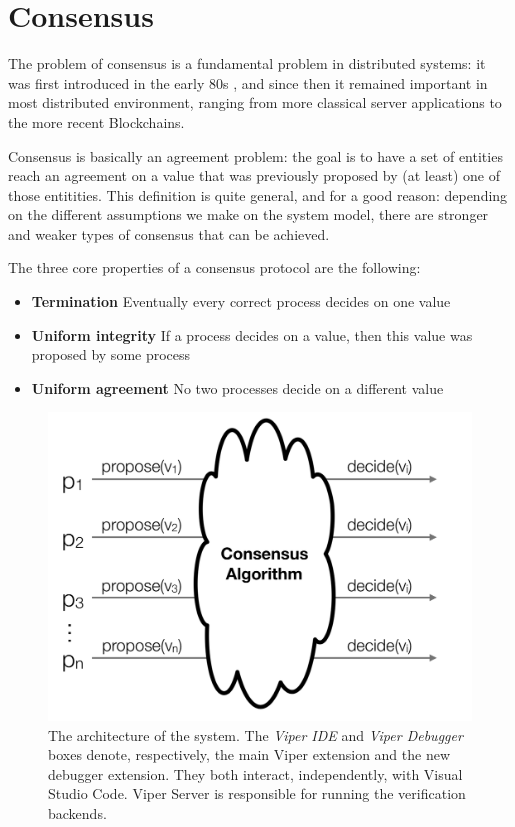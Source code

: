\section{Consensus}\label{sec:Consensus}

The problem of consensus is a fundamental problem in distributed systems: it was first introduced in the early 80s \cite[]{Pease}, \cite[]{Lamport} and since then it remained important in most distributed environment, ranging from more classical server applications to the more recent Blockchains.

Consensus is basically an agreement problem: the goal is to have a set of entities reach an agreement on a value that was previously proposed by (at least) one of those entitities. This definition is quite general, and for a good reason: depending on the different assumptions we make on the system model, there are stronger and weaker types of consensus that can be achieved. 

The three core properties of a consensus protocol are the following:

\begin{itemize}
    \item \textbf{Termination} Eventually every correct process decides on one value
    \item \textbf{Uniform integrity} If a process decides on a value, then this value was proposed by some process
    \item \textbf{Uniform agreement} No two processes decide on a different value
    \end{itemize}

\begin{figure}[htb]
  \centering
  \includegraphics{img/consensus.png}
  \caption[The architecture of the system]{ The architecture of the system. The
    \textit{Viper IDE} and \textit{Viper Debugger} boxes denote, respectively,
    the main Viper extension and the new debugger extension. They both interact,
    independently, with Visual Studio Code. Viper Server is responsible for
    running the verification backends.}
  \label{fig:consensus}
\end{figure}

